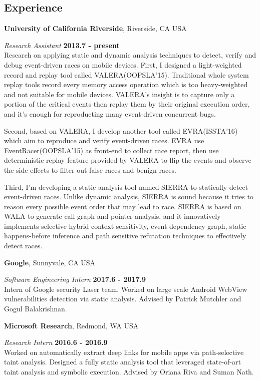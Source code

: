 \documentclass[margin,line]{res}
\begin{document}
\begin{resume}
\section{\sc Experience}
{\bf University of California Riverside}, Riverside, CA USA

\vspace{-.3cm}
{\em Research Assistant} \hfill {\bf 2013.7 - present}\\
Research on applying static and dynamic analysis techniques to detect, verify and debug
event-driven races on mobile devices.
First, I designed a light-weighted record and replay tool called VALERA(OOPSLA'15).
Traditional whole system replay tools record every memory access operation which is
too heavy-weighted and not suitable for mobile devices. VALERA's insight is to capture
only a portion of the critical events then replay them by their original execution order, 
and it's enough for reproducting many event-driven concurrent bugs.

\vspace{-.3cm}
Second, based on VALERA, I develop another tool called EVRA(ISSTA'16) which aim
to reproduce and verify event-driven races. EVRA use EventRacer(OOPSLA'15) as front-end
to collect race report, then use deterministic replay feature provided by VALERA to flip the
events and observe the side effects to filter out false races and benign races.

\vspace{-.3cm}
Third, I'm developing a static analysis tool named SIERRA to statically detect event-driven races.
Unlike dynamic analysis, SIERRA is sound because it tries to reason every possible event order
that may lead to race. SIERRA is based on WALA to generate call graph and pointer analysis,
and it innovatively implements selective hybrid context sensitivity, event dependency graph, static 
happens-before inference and path sensitive refutation techniques to effectively detect races.

{\bf Google}, Sunnyvale, CA USA

\vspace{-.3cm}
{\em Software Engineering Intern} \hfill {\bf 2017.6 - 2017.9}\\
Intern of Google security Laser team. Worked on large scale Android WebView vulnerabilities
detection via static analysis. Advised by Patrick Mutchler and Gogul Balakrishnan.

{\bf Microsoft Research}, Redmond, WA USA

\vspace{-.3cm}
{\em Research Intern} \hfill {\bf 2016.6 - 2016.9}\\
Worked on automatically extract deep links for mobile apps via path-selective taint analysis.
Designed a fully static analysis tool that leveraged state-of-art taint analysis and symbolic execution.
Advised by Oriana Riva and Suman Nath.


\end{resume}
\end{document}
